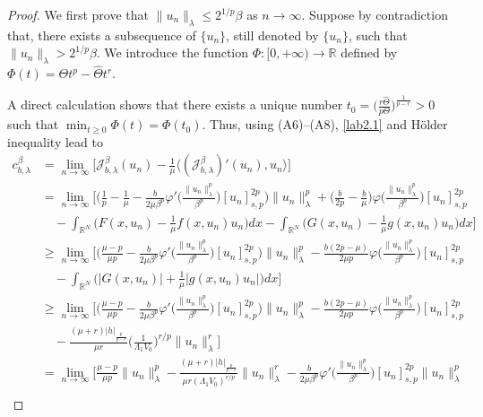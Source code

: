 \documentclass[reqno]{amsart}
\begin{document}
\begin{proof}
We first prove that $\|u_n\|_\lambda\leq 2^{1/p}\beta$ as $n\to \infty$.
Suppose by contradiction that, there exists a subsequence of $\{u_n\}$, still 
denoted by $\{u_n\}$, such that $\|u_n\|_\lambda> 2^{1/p}\beta$.
We introduce the function $\Phi: [0,+\infty)\to  \mathbb{R}$ defined by
$\Phi(t)=\Theta t^p-\widehat{\Theta}t^r$.

A direct calculation shows that there exists a unique number
$t_0=\big(\frac{r\widehat{\Theta}}{p\Theta}\big)^\frac{1}{p-r}>0$
such that $\min_{t\geq0}\Phi(t)=\Phi(t_0)$. 
Thus, using (A6)--(A8), \eqref{lab2.1} and H\"older inequality lead to
\begin{align*}
 c_{b,\lambda}^\beta
&= \lim_{n\to \infty} \Big[\mathcal{J}^\beta_{b,\lambda}(u_n)-\frac{1}{\mu} 
 \langle (\mathcal{J}^\beta_{b,\lambda})'(u_n), u_n\rangle \Big] \\
&= \lim_{n\to \infty} \Big[\Big(\frac{1}{p}-\frac{1}{\mu}-\frac{b}{2\mu\beta^p}
 \varphi'\Big( \frac{\|u_n\|^p_\lambda}{\beta^p}\Big) [u_n]^{2p}_{s,p}\Big)
 \|u_n\|^p_\lambda+\Big(\frac{b}{2p}-\frac{b}{\mu}\Big)\varphi
 \Big( \frac{\|u_n\|^p_\lambda}{\beta^p}\Big) [u_n]^{2p}_{s,p}  \\
&\quad -\int_{\mathbb{R}^N}\Big(F(x,u_n)-\frac{1}{\mu}f(x,u_n)u_n\Big)dx
 -\int_{\mathbb{R}^N}\Big(G(x,u_n)-\frac{1}{\mu}g(x,u_n)u_n\Big)                        dx \Big]   \\
&\geq \lim_{n\to \infty} \Big[\Big(\frac{\mu-p}{\mu p}
 -\frac{b}{2\mu\beta^p} \varphi'\Big( \frac{\|u_n\|^p_\lambda}{\beta^p}\Big)
  [u_n]^{2p}_{s,p}\Big)\|u_n\|^p_\lambda-\frac{b(2p-\mu)}{2\mu p}
  \varphi\Big( \frac{\|u_n\|^p_\lambda}{\beta^p}\Big) [u_n]^{2p}_{s,p}  \\
&\quad -\int_{\mathbb{R}^N} \Big(|G(x,u_n)|+\frac{1}{\mu}|g(x,u_n)u_n|\Big)dx \Big]  \\
&\geq \lim_{n\to \infty} \Big[ \Big(\frac{\mu-p}{\mu p} -\frac{b}{2\mu\beta^p} 
 \varphi'\Big( \frac{\|u_n\|^p_\lambda}{\beta^p}\Big) [u_n]^{2p}_{s,p}\Big)
 \|u_n\|^p_\lambda-\frac{b(2p-\mu)}{2\mu p}\varphi
 \Big( \frac{\|u_n\|^p_\lambda}{\beta^p}\Big) [u_n]^{2p}_{s,p}  \\
&\quad -\frac{(\mu+r)|h|_{\frac{p}{p-r}}}{\mu r}\Big(\frac{1}{\Lambda_1V_0}
 \Big)^{r/p}\|u_n\|^r_\lambda  \Big]  \\
&= \lim_{n\to \infty} \Big[\frac{\mu-p}{\mu p}\|u_n\|^p_\lambda
 -\frac{(\mu+r)|h|_{\frac{p}{p-r}}}{\mu r (\Lambda_1 V_0)^{r/p}}
 \|u_n\|^r_\lambda-\frac{b}{2\mu\beta^p}
\varphi'\Big(\frac{\|u_n\|^p_\lambda}{\beta^p}\Big) [u_n]^{2p}_{s,p}\|u_n\|^p_\lambda  \\

\end{align*}
\end{proof}
\end{document}

